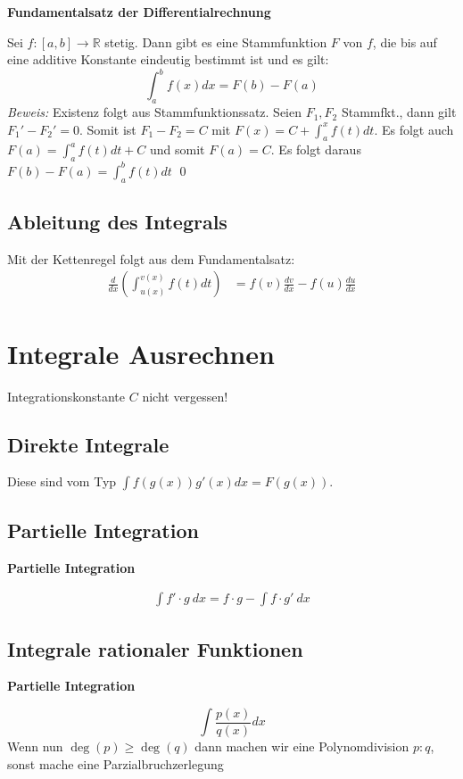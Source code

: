 \documentclass[25pt]{sciposter}
\newcommand{\R}{\mathbb{R}}
\newenvironment{method}[1]{\begin{mdframed}[backgroundcolor=blue!10,innertopmargin=15pt, innerbottommargin=15pt, nobreak=true]
		\textbf{#1 }
	}
	{ 
	\end{mdframed}
}
\newenvironment{important}{\begin{mdframed}[backgroundcolor=red!50,innertopmargin=15pt, innerbottommargin=15pt, nobreak=true]
		\Large
	}
	{ 
	\end{mdframed}
}
\begin{document}
\begin{multicols}{3}
\begin{method}{Fundamentalsatz der Differentialrechnung}
Sei $f:[a,b] \to \R$ stetig. Dann gibt es eine Stammfunktion $F$ von $f$, die bis auf eine additive Konstante eindeutig bestimmt ist und es gilt:
$$\int_{a}^{b} f(x) dx = F(b) - F(a)$$
\textit{Beweis:} Existenz folgt aus Stammfunktionssatz. Seien $F_1, F_2$ Stammfkt., dann gilt $F_1' - F_2' = 0$. Somit ist $F_1 - F_2 = C$ mit $F(x) = C + \int_{a}^{x} f(t) dt$. Es folgt auch $F(a) = \int_{a}^{a} f(t) dt + C$ und somit $F(a) = C$. Es folgt daraus $F(b)-F(a) = \int_{a}^{b} f(t) dt$ \qed 
\end{method}


\subsection*{Ableitung des Integrals}
Mit der Kettenregel folgt aus dem Fundamentalsatz:
\begin{align*}
\frac{d}{dx} \left( \int_{u(x)}^{v(x)} f(t)  dt \right) &= f(v)\frac{dv}{dx} - f(u)\frac{du}{dx}
\end{align*}

\section*{Integrale Ausrechnen}

\begin{important}
Integrationskonstante $C$ nicht vergessen!
\end{important}

\subsection*{Direkte Integrale}
Diese sind vom Typ $\int f(g(x)) g'(x) dx = F(g(x))$.

\subsection*{Partielle Integration}
\begin{method}{Partielle Integration}
\begin{align*}
	\int f' \cdot g \ dx = f \cdot g - \int f \cdot g' \  dx
\end{align*}
\end{method}



\subsection*{Integrale rationaler Funktionen}
\begin{method}{Partielle Integration}
	$$\int \frac{p(x)}{q(x)} dx$$
	Wenn nun $\deg(p) \geq \deg(q)$ dann machen wir eine Polynomdivision $p:q$, sonst mache eine Parzialbruchzerlegung
\end{method}


\end{multicols}
\end{document}
